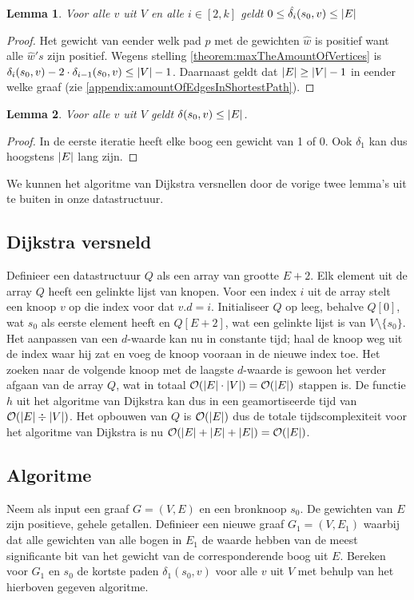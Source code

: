 \documentclass[conference]{IEEEtran}
\newtheorem{lemma}{Lemma}[section]
\theoremstyle{definition}
\theoremstyle{remark}
\DeclarePairedDelimiter{\card}{\vert}{\vert}  %
\begin{document}
\begin{lemma}
    Voor alle $v$ uit $V$ en alle $i \in [2, k]$ geldt $0 \leq \hat{\delta_i}(s_0, v) \leq \card{E}$
\end{lemma}
\begin{proof}
    Het gewicht van eender welk pad $p$ met de gewichten $\hat{w}$ is positief want alle $\hat{w}'s$ zijn positief. Wegens stelling \ref{theorem:maxTheAmountOfVertices} is $\delta_i(s_0, v) - 2 \cdot \delta_{i-1}(s_0, v) \leq \card{V} -1$. Daarnaast geldt dat $\card{E} \geq \card{V} - 1$ in eender welke graaf (zie \ref{appendix:amountOfEdgesInShortestPath}).
\end{proof}

\begin{lemma}
    Voor alle $v$ uit $V$ geldt $\delta(s_0, v) \leq \card{E}$.
\end{lemma}
\begin{proof}
    In de eerste iteratie heeft elke boog een gewicht van 1 of 0. Ook $\delta_1$ kan dus hoogstens $\card{E}$ lang zijn.
\end{proof}

We kunnen het algoritme van Dijkstra versnellen door de vorige twee lemma's uit te buiten in onze datastructuur.

\subsection{Dijkstra versneld}
Definieer een datastructuur $Q$ als een array van grootte $E + 2$. Elk element uit de array $Q$ heeft een gelinkte lijst van knopen. Voor een index $i$ uit de array stelt een knoop $v$ op die index voor dat $v.d = i$. Initialiseer $Q$ op leeg, behalve $Q[0]$, wat $s_0$ als eerste element heeft en $Q[E + 2]$, wat een gelinkte lijst is van $V \setminus \{s_0\}$. Het aanpassen van een $d$-waarde kan nu in constante tijd; haal de knoop weg uit de index waar hij zat en voeg de knoop vooraan in de nieuwe index toe. Het zoeken naar de volgende knoop met de laagste $d$-waarde is gewoon het verder afgaan van de array $Q$, wat in totaal $\mathcal{O}(\card{E} \cdot \card{V}) = \mathcal{O}(\card{E})$ stappen is. De functie $h$ uit het algoritme van Dijkstra kan dus in een geamortiseerde tijd van $\mathcal{O}(\card{E} \div \card{V})$. Het opbouwen van $Q$ is $\mathcal{O}(\card{E})$ dus de totale tijdscomplexiteit voor het algoritme van Dijkstra is nu $\mathcal{O}(\card{E} + \card{E} + \card{E}) = \mathcal{O}(\card{E})$.

\subsection{Algoritme}
Neem als input een graaf $G = (V, E)$ en een bronknoop $s_0$. De gewichten van $E$ zijn positieve, gehele getallen. Definieer een nieuwe graaf $G_1 = (V, E_1)$ waarbij dat alle gewichten van alle bogen in $E_1$ de waarde hebben van de meest significante bit van het gewicht van de corresponderende boog uit $E$. Bereken voor $G_1$ en $s_0$ de kortste paden $\delta_1(s_0, v)$ voor alle $v$ uit $V$ met behulp van het hierboven gegeven algoritme.
\end{document}
